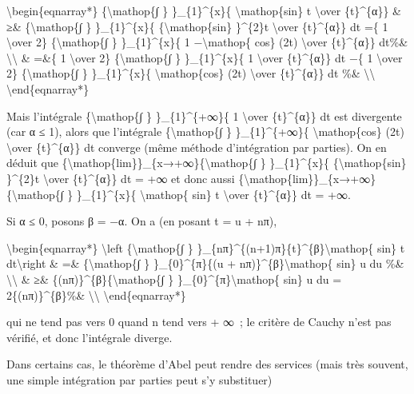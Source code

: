 \documentclass[]{article}
\begin{document}
\textbackslash{}begin\{eqnarray*\} \{\textbackslash{}mathop\{∫ \}
\}\_\{1\}\^{}\{x\}\{ \textbar{}\textbackslash{}mathop\{sin\} t\textbar{}
\textbackslash{}over \{t\}\^{}\{α\}\} \& ≥\& \{\textbackslash{}mathop\{∫
\} \}\_\{1\}\^{}\{x\}\{ \{\textbackslash{}mathop\{sin\} \}\^{}\{2\}t
\textbackslash{}over \{t\}\^{}\{α\}\} dt =\{ 1 \textbackslash{}over 2\}
\{\textbackslash{}mathop\{∫ \} \}\_\{1\}\^{}\{x\}\{ 1
−\textbackslash{}mathop\{ cos\} (2t) \textbackslash{}over
\{t\}\^{}\{α\}\} dt\%\& \textbackslash{}\textbackslash{} \& =\&\{ 1
\textbackslash{}over 2\} \{\textbackslash{}mathop\{∫ \}
\}\_\{1\}\^{}\{x\}\{ 1 \textbackslash{}over \{t\}\^{}\{α\}\} dt −\{ 1
\textbackslash{}over 2\} \{\textbackslash{}mathop\{∫ \}
\}\_\{1\}\^{}\{x\}\{ \textbackslash{}mathop\{cos\} (2t)
\textbackslash{}over \{t\}\^{}\{α\}\} dt \%\&
\textbackslash{}\textbackslash{} \textbackslash{}end\{eqnarray*\}

Mais l'intégrale \{\textbackslash{}mathop\{∫ \} \}\_\{1\}\^{}\{+∞\}\{ 1
\textbackslash{}over \{t\}\^{}\{α\}\} dt est divergente (car α ≤ 1),
alors que l'intégrale \{\textbackslash{}mathop\{∫ \}
\}\_\{1\}\^{}\{+∞\}\{ \textbackslash{}mathop\{cos\} (2t)
\textbackslash{}over \{t\}\^{}\{α\}\} dt converge (même méthode
d'intégration par parties). On en déduit que
\{\textbackslash{}mathop\{lim\}\}\_\{x→+∞\}\{\textbackslash{}mathop\{∫
\} \}\_\{1\}\^{}\{x\}\{ \{\textbackslash{}mathop\{sin\} \}\^{}\{2\}t
\textbackslash{}over \{t\}\^{}\{α\}\} dt = +∞ et donc aussi
\{\textbackslash{}mathop\{lim\}\}\_\{x→+∞\}\{\textbackslash{}mathop\{∫
\} \}\_\{1\}\^{}\{x\}\{ \textbar{}\textbackslash{}mathop\{ sin\}
t\textbar{} \textbackslash{}over \{t\}\^{}\{α\}\} dt = +∞.

Si α ≤ 0, posons β = −α. On a (en posant t = u + nπ),

\textbackslash{}begin\{eqnarray*\} \textbackslash{}left
\textbar{}\{\textbackslash{}mathop\{∫ \}
\}\_\{nπ\}\^{}\{(n+1)π\}\{t\}\^{}\{β\}\textbackslash{}mathop\{ sin\} t
dt\textbackslash{}right \textbar{}\& =\& \{\textbackslash{}mathop\{∫ \}
\}\_\{0\}\^{}\{π\}\{(u + nπ)\}\^{}\{β\}\textbackslash{}mathop\{ sin\} u
du \%\& \textbackslash{}\textbackslash{} \& ≥\&
\{(nπ)\}\^{}\{β\}\{\textbackslash{}mathop\{∫ \}
\}\_\{0\}\^{}\{π\}\textbackslash{}mathop\{ sin\} u du =
2\{(nπ)\}\^{}\{β\}\%\& \textbackslash{}\textbackslash{}
\textbackslash{}end\{eqnarray*\}

qui ne tend pas vers 0 quand n tend vers + ∞~; le critère de Cauchy
n'est pas vérifié, et donc l'intégrale diverge.

Dans certains cas, le théorème d'Abel peut rendre des services (mais
très souvent, une simple intégration par parties peut s'y substituer)
\end{document}
